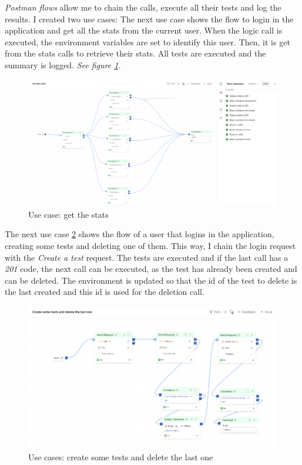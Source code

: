 \textit{Postman flows} allow me to chain the calls, execute all their tests and log the results. I created two use cases:
The next use case shows the flow to login in the application and get all the stats from the current user. When the logic call 
is executed, the environment variables are set to identify this user. Then, it is get from the stats calls to retrieve their stats. 
All tests are executed and the summary is logged. \textit{See figure \ref{fig:test_getstats}}.
\begin{figure}[H]
    \centering
        \includegraphics[angle=90, width=\textwidth, height=\textheight]{assets/postman_getstats.png}
    \caption{Use case: get the stats}
    \label{fig:test_getstats}
\end{figure}

The next use case \ref{fig:test_createanddeleteatest} shows the flow of a user that logins in the application, creating some tests and deleting one of them. 
This way, I chain the login request with the \textit{Create a test} request. The tests are executed and if the last call has a \textit{201} code, 
the next call can be executed, as the test has already been created and can be deleted. The environment is updated so that the id of the test to delete 
is the last created and this id is used for the deletion call.
\begin{figure}[H]
    \centering
        \includegraphics[angle=90, width=\textwidth, height=\textheight]{assets/postman_delete.png}
    \caption{Use cases: create some tests and delete the last one}
    \label{fig:test_createanddeleteatest}
\end{figure}

